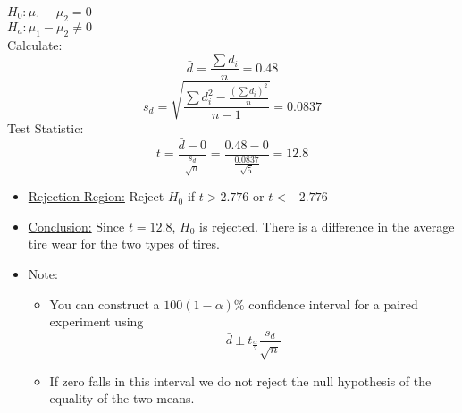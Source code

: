 \documentclass[12pt, letterpaper]{article}
\begin{document}
                \begin{mdframed}[leftmargin=0.5cm, rightmargin=0.5cm]
                    $H_0: \mu_1 - \mu_2 = 0$ \\ $H_a: \mu_1 - \mu_2 \neq 0$ \\
                    Calculate:
                    \begin{equation*}
                        \bar{d} = \frac{\sum d_i}{n} = 0.48
                    \end{equation*}
                    \begin{equation*}
                        s_d = \sqrt{\frac{\sum d_i^2 - \frac{(\sum d_i)^2}{n}}{n - 1}} = 0.0837
                    \end{equation*}
                    Test Statistic:
                    \begin{equation*}
                        t = \frac{\bar{d} - 0}{\frac{s_d}{\sqrt{n}}} = \frac{0.48 - 0}{\frac{0.0837}{\sqrt{5}}} = 12.8
                    \end{equation*}
                \end{mdframed}
                \begin{itemize}
                    \item \underline{Rejection Region:} Reject $H_0$ if $t > 2.776$ or $t < -2.776$
                    \item \underline{Conclusion:} Since $t = 12.8$, $H_0$ is rejected. There is a difference in the average tire wear for the two types of tires.
                    \item Note:
                    \begin{itemize}
                        \item You can construct a $100(1- \alpha)\%$ confidence interval for a paired experiment using $$\bar{d} \pm t_{\frac{\alpha}{2}} \frac{s_d}{\sqrt{n}}$$
                        \item If zero falls in this interval we do not reject the null hypothesis of the equality of the two means.
                    \end{itemize}
                \end{itemize}
\end{document}

